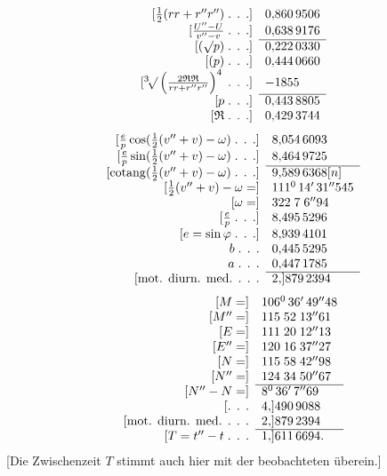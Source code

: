 \noindent{\small [S. 5]}
\[
\begin{array}{rl}
{}[\frac12(rr+r''r'')\;\text{. . .}]&0{,}860\,9506\\
{}[\frac{U''-U}{v''-v}\;\text{. . .}]&0{,}638\,9176\\\cline{2-2}
{}[(\surd p)\;\text{. . .}]&0{,}222\,0330\\
{}[(p)\;\text{. . .}]&0{,}444\,0660\\
{}[\mathord{{}^{3}\!\surd}\left(\frac{2\mathfrak R\mathfrak R}{rr+r''r''}\right)^4\;\text{. . .}]&-1855\\\cline{2-2}
{}[p\;\text{. . .}]&0{,}443\,8805\\
{}[\mathfrak R\;\text{. . .}]&0{,}429\,3744
\end{array}
\]
\[
\begin{array}{rl}
{}[\frac ep\cos(\frac12(v''+v)-\omega)\;\text{. . .}]&8{,}054\,6093\\
{}[\frac ep\sin(\frac12(v''+v)-\omega)\;\text{. . .}]&8{,}464\,9725\\\cline{2-2}
{}[\operatorname{cotang}(\frac12(v''+v)-\omega)\;\text{. . .}]&9{,}589\,6368[n]\\
{}[\frac12(v''+v)-\omega=]&111^0\,14'\,31''545\\
{}[\omega=]&322\;7\;6''94\\
{}[\frac ep\;\text{. . .}]&8{,}495\,5296\\
{}[e=\sin\varphi\;\text{. . .}]&8{,}939\,4101\\
b\;\text{. . .}&0{,}445\,5295\\
a\;\text{. . .}&0{,}447\,1785\\\cline{2-2}
{}[\text{mot. diurn. med. . . .}&2{,}]879\,2394
\end{array}
\]
\[
\begin{array}{rl}
{}[M=]&106^0\,36'\,49''48\\
{}[M''=]&115\;52\;13''61\\
{}[E=]&111\;20\;12''13\\
{}[E''=]&120\;16\;37''27\\
{}[N=]&115\;58\;42''98\\
{}[N''=]&124\;34\;50''67\\\cline{2-2}
{}[N''-N=]&8^0\,36'\,7''69\\
{}[\text{. . .}&4{,}]490\,9088\\
{}[\text{mot. diurn. med. . . .}&2{,}]879\,2394\\\cline{2-2}
{}[T=t''-t\;\text{. . .}&1{,}]611\,6694.
\end{array}
\]
\noindent\hspace*{\parindent}[Die Zwischenzeit $T$ stimmt auch hier mit der beobachteten überein.]
